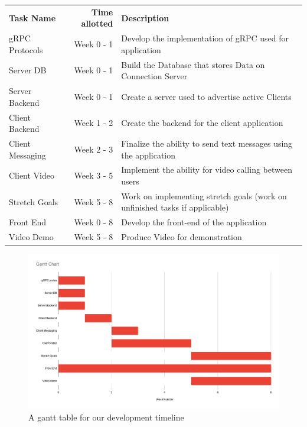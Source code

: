 \documentclass[titlepage]{article}
\begin{document}
	\begin{tabular}{l r l}
		\textbf{Task Name}	& \textbf{Time allotted} & \textbf{Description}\\
		gRPC Protocols		& Week 0 - 1 & Develop the implementation of gRPC used for application\\
		Server DB  			& Week 0 - 1 & Build the Database that stores Data on Connection Server\\
		Server Backend 		& Week 0 - 1 & Create a server used to advertise active Clients\\
		Client Backend 		& Week 1 - 2 & Create the backend for the client application\\
		Client Messaging 	& Week 2 - 3 & Finalize the ability to send text messages using the application\\
		Client Video 		& Week 3 - 5 & Implement the ability for video calling between users\\
		Stretch Goals 		& Week 5 - 8 & Work on implementing stretch goals (work on unfinished tasks if applicable)\\
		Front End  			& Week 0 - 8 & Develop the front-end of the application\\
		Video Demo	 		& Week 5 - 8 & Produce Video for demonstration \\	
	\end{tabular}

	\begin{center}
		\begin{figure}[!ht]
			\includegraphics[scale=.35]{graphics/GanttChart.png}
			\caption{A gantt table for our development timeline}
		\end{figure}
	\end{center}
	
\end{document}
